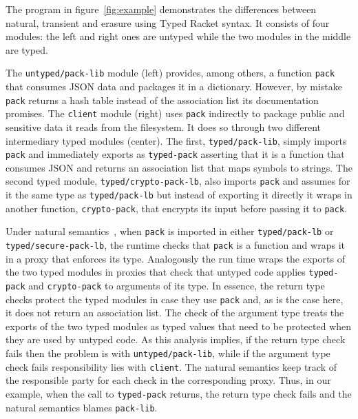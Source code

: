 
The  program in figure~\ref{fig:example} demonstrates the differences
between natural, transient and erasure using Typed Racket syntax.  It
consists of four modules: the left and right ones are untyped while
the two modules in the middle are typed.

The \texttt{untyped/pack-lib} module (left) provides, among
others, a function \texttt{pack} that consumes JSON data and packages it
in a dictionary. However, by mistake \texttt{pack} returns
a hash table instead of the association list its documentation promises.
The \texttt{client} module (right) uses \texttt{pack} indirectly to
package public and sensitive data it reads from the filesystem. It does so
through two different intermediary typed modules (center). The first,
\texttt{typed/pack-lib}, simply imports \texttt{pack} and immediately
exports as \texttt{typed-pack} asserting that it is a function
that consumes JSON and returns an association list that maps symbols to
strings. The second typed module, \texttt{typed/crypto-pack-lb},
also imports \texttt{pack} and assumes for it the same type as
\texttt{typed/pack-lb} but instead of exporting it directly it wraps in
another function, \texttt{crypto-pack}, that encrypts its input before
passing it to \texttt{pack}.

Under natural semantics~\cite{tf-popl-2008,tfffgksst-snapl-2017}, when
\texttt{pack} is imported in either \texttt{typed/pack-lb} or
\texttt{typed/secure-pack-lb}, the runtime checks that \texttt{pack} is a
function and wraps it in a proxy that enforces its  type.  Analogously
the run time wraps the exports of the two typed modules in proxies that
check that untyped code applies \texttt{typed-pack} and
\texttt{crypto-pack} to arguments of its type. In essence, the
return type checks protect  the typed modules in case they use
\texttt{pack} and, as is the case here, it does not return an association
list. The check of the argument type  treats the
exports of the two typed modules as typed values that need to be protected
when they are used by untyped code.  As this analysis implies, if the
return type check fails then the problem is with
\texttt{untyped/pack-lib}, while if the argument type check fails
responsibility lies with \texttt{client}. The natural semantics keep track
of the responsible party for each check in the corresponding proxy. Thus,
in our example, when the call to \texttt{typed-pack} returns, the return
type check fails and the natural semantics blames \texttt{pack-lib}.

